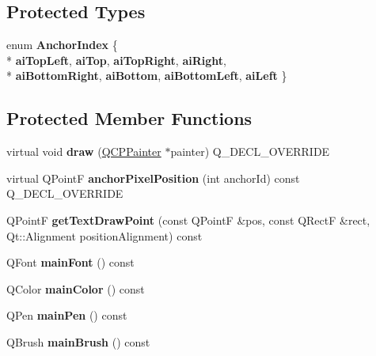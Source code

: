 \subsection*{Protected Types}
\begin{DoxyCompactItemize}
\item 
enum {\bfseries Anchor\+Index} \{ \\*
{\bfseries ai\+Top\+Left}, 
{\bfseries ai\+Top}, 
{\bfseries ai\+Top\+Right}, 
{\bfseries ai\+Right}, 
\\*
{\bfseries ai\+Bottom\+Right}, 
{\bfseries ai\+Bottom}, 
{\bfseries ai\+Bottom\+Left}, 
{\bfseries ai\+Left}
 \}\hypertarget{classQCPItemText_a14a84e58f72519c8ae1d7a4a1dd23f21}{}\label{classQCPItemText_a14a84e58f72519c8ae1d7a4a1dd23f21}

\end{DoxyCompactItemize}
\subsection*{Protected Member Functions}
\begin{DoxyCompactItemize}
\item 
virtual void {\bfseries draw} (\hyperlink{classQCPPainter}{Q\+C\+P\+Painter} $\ast$painter) Q\+\_\+\+D\+E\+C\+L\+\_\+\+O\+V\+E\+R\+R\+I\+DE\hypertarget{classQCPItemText_a8f8f075da83b6547c2b32e1f64cf0554}{}\label{classQCPItemText_a8f8f075da83b6547c2b32e1f64cf0554}

\item 
virtual Q\+PointF {\bfseries anchor\+Pixel\+Position} (int anchor\+Id) const Q\+\_\+\+D\+E\+C\+L\+\_\+\+O\+V\+E\+R\+R\+I\+DE\hypertarget{classQCPItemText_afcdb1724d88d561f65da95fb54b0acb7}{}\label{classQCPItemText_afcdb1724d88d561f65da95fb54b0acb7}

\item 
Q\+PointF {\bfseries get\+Text\+Draw\+Point} (const Q\+PointF \&pos, const Q\+RectF \&rect, Qt\+::\+Alignment position\+Alignment) const \hypertarget{classQCPItemText_aa6e478b1ce198eace89157c4cacc3ddc}{}\label{classQCPItemText_aa6e478b1ce198eace89157c4cacc3ddc}

\item 
Q\+Font {\bfseries main\+Font} () const \hypertarget{classQCPItemText_a23d391bd6471c45e73f45add67ede902}{}\label{classQCPItemText_a23d391bd6471c45e73f45add67ede902}

\item 
Q\+Color {\bfseries main\+Color} () const \hypertarget{classQCPItemText_ad7bf17e4945cc86bbf9a36331da059a0}{}\label{classQCPItemText_ad7bf17e4945cc86bbf9a36331da059a0}

\item 
Q\+Pen {\bfseries main\+Pen} () const \hypertarget{classQCPItemText_a9ade32d362b22853659201c738269e2a}{}\label{classQCPItemText_a9ade32d362b22853659201c738269e2a}

\item 
Q\+Brush {\bfseries main\+Brush} () const \hypertarget{classQCPItemText_a10d6585a030633aa79d5ebc5a437f183}{}\label{classQCPItemText_a10d6585a030633aa79d5ebc5a437f183}

\end{DoxyCompactItemize}
